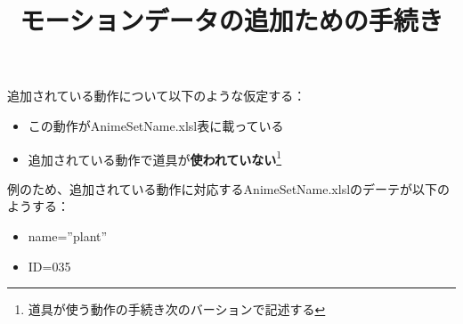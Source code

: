 \documentclass[a4paper]{report}
\title{モーションデータの追加ための手続き}
\newcommand{\tname}{{\ttfamily AnimeSetName.xlsl}}
\begin{document}
\maketitle
追加されている動作について以下のような仮定する：
\begin{itemize}
	\item この動作が{\ttfamily AnimeSetName.xlsl}表に載っている
	\item 追加されている動作で道具が\textbf{使われていない}\footnote{道具が使う動作の手続き次のバーションで記述する}
\end{itemize}
例のため、追加されている動作に対応する\tname のデーテが以下のようする：
\begin{itemize}
	\item {\ttfamily name=''plant''}
	\item {\ttfamily ID=035}
\end{itemize}
\end{document}
